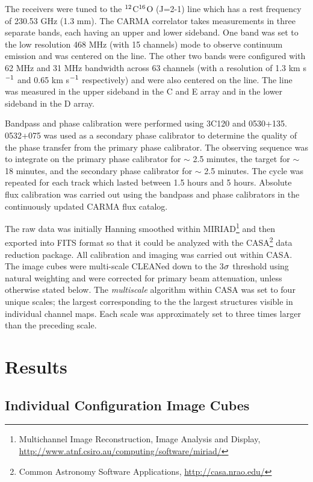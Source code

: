 \documentclass[manuscript]{aastex}
\begin{document}
The receivers were tuned to the $\rm{{}^{12}}$C$\rm{{}^{16}}$O (J=2-1) line which has a rest frequency of 230.53 GHz (1.3 mm). The CARMA correlator takes measurements in three separate bands, each having an upper and lower sideband. One band was set to the low resolution 468 MHz   (with 15 channels) mode to observe continuum emission and was centered on the line. The other two bands were configured with 62 MHz and 31 MHz bandwidth across 63 channels (with a resolution of 1.3 km s$\rm{{}^{-1}}$ and 0.65 km s$\rm{{}^{-1}}$ respectively) and were also centered on the line. The line was measured in the upper sideband in the C and E array and in the lower sideband in the D array.

Bandpass and phase calibration were performed using 3C120 and 0530+135. 0532+075 was used as a secondary phase calibrator to determine the quality of the phase transfer from the primary phase calibrator. The observing sequence was to integrate on the primary phase calibrator for $\sim$ 2.5 minutes, the target for $\sim$ 18 minutes, and the secondary phase calibrator for $\sim$ 2.5 minutes. The cycle was repeated for each track which lasted between 1.5 hours and 5 hours. Absolute flux calibration was carried out using the bandpass and phase calibrators in the continuously updated CARMA flux catalog.

The raw data was initially Hanning smoothed within MIRIAD\footnote{Multichannel Image Reconstruction, Image Analysis and Display, \url{http://www.atnf.csiro.au/computing/software/miriad/}} and then exported into FITS format so that it could be analyzed with the CASA\footnote{Common Astronomy Software Applications, \url{http://casa.nrao.edu/}} data reduction package. All calibration and imaging was carried out within CASA. The image cubes  were multi-scale  CLEANed down to the 3$\rm{\sigma}$ threshold using natural weighting and were corrected for primary beam attenuation, unless otherwise stated below. The \textit{multiscale} algorithm \citep{rich08} within CASA was set to four unique scales; the largest corresponding to the the largest structures visible in individual channel maps. Each scale was approximately set to three times larger than the preceding scale. 
\section{Results} 

\subsection{Individual Configuration Image Cubes} \label{results1} %
\end{document}
